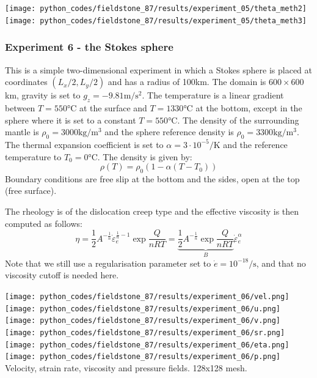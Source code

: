 \begin{center}
\texttt{[image: python\_codes/fieldstone\_87/results/experiment\_05/theta\_meth2]}
\texttt{[image: python\_codes/fieldstone\_87/results/experiment\_05/theta\_meth3]}
\end{center}



\newpage
\subsubsection*{Experiment 6 - the Stokes sphere}

This is a simple two-dimensional experiment in which a Stokes sphere is placed at coordinates 
$(L_x/2,L_y/2)$ and has a radius of 100\si{\kilo\metre}. 
The domain is $600\times600$\si{\kilo\metre}, 
gravity is set to $g_z=-9.81\si{\metre\per\square\second}$.
The temperature is a linear gradient between  $T=550\si{\celsius}$ 
at the surface and $T=1330\si{\celsius}$ at the bottom,
except in the sphere where it is set to a constant $T=550\si{\celsius}$.
The density of the surrounding mantle is $\rho_0=3000\si{\kilogram\per\cubic\meter}$ 
and the sphere reference density is $\rho_0=3300\si{\kilogram\per\cubic\meter}$. The thermal expansion 
coefficient is set to $\alpha=3\cdot 10^{-5} \si{\per\kelvin}$ and the reference temperature to $T_0=0\si{\celsius}$.
The density is given by: 
\[
\rho(T)=\rho_0(1-\alpha(T-T_0))
\]
Boundary conditions are free slip at the bottom and the sides, open at the top (free surface).

The rheology is of the dislocation creep type and the effective viscosity is then computed as follows:
\[
\eta 
= \frac{1}{2} A^{-\frac1n} \dot\varepsilon_e^{\frac1n-1}  \exp \frac{Q}{nRT} 
= \underbrace{ \frac{1}{2} A^{-\frac1n} \exp \frac{Q}{nRT} }_{B} \dot\varepsilon_e^{\alpha}  
\]
Note that we still use a regularisation parameter set to $\dot{e}=10^{-18}\si{\per\second}$, 
and that no viscosity cutoff is needed here. 


\begin{center}
\texttt{[image: python\_codes/fieldstone\_87/results/experiment\_06/vel.png]}
\texttt{[image: python\_codes/fieldstone\_87/results/experiment\_06/u.png]}
\texttt{[image: python\_codes/fieldstone\_87/results/experiment\_06/v.png]}\\
\texttt{[image: python\_codes/fieldstone\_87/results/experiment\_06/sr.png]}
\texttt{[image: python\_codes/fieldstone\_87/results/experiment\_06/eta.png]}
\texttt{[image: python\_codes/fieldstone\_87/results/experiment\_06/p.png]}\\
{\captionfont Velocity, strain rate, viscosity and pressure fields. 128x128 mesh.}
\end{center}

